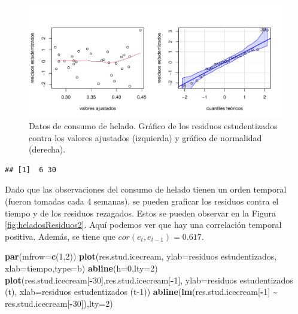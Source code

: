 \documentclass[
]{article}
\newenvironment{Shaded}{\begin{snugshade}}{\end{snugshade}}
\newcommand{\AttributeTok}[1]{\textcolor[rgb]{0.13,0.29,0.53}{#1}}
\newcommand{\DecValTok}[1]{\textcolor[rgb]{0.00,0.00,0.81}{#1}}
\newcommand{\FunctionTok}[1]{\textcolor[rgb]{0.13,0.29,0.53}{\textbf{#1}}}
\newcommand{\NormalTok}[1]{#1}
\newcommand{\SpecialCharTok}[1]{\textcolor[rgb]{0.81,0.36,0.00}{\textbf{#1}}}
\newcommand{\StringTok}[1]{\textcolor[rgb]{0.31,0.60,0.02}{#1}}
\begin{document}
\begin{figure}

{\centering \includegraphics{MLG1_files/figure-latex/heladosResiduos1-1} 

}

\caption{Datos de consumo de helado. Gráfico de los residuos estudentizados contra los valores ajustados (izquierda) y gráfico de normalidad (derecha).}\label{fig:heladosResiduos1}
\end{figure}

\begin{verbatim}
## [1]  6 30
\end{verbatim}

Dado que las observaciones del consumo de helado tienen un orden temporal (fueron tomadas cada 4 semanas), se pueden graficar los residuos contra el tiempo y de los residuos rezagados. Estos se pueden observar en la Figura \ref{fig:heladosResiduos2}. Aquí podemos ver que hay una correlación temporal positiva. Además, se tiene que \(cor(e_{t},e_{t-1}) = 0.617\).

\begin{Shaded}
\begin{Highlighting}[]
\FunctionTok{par}\NormalTok{(}\AttributeTok{mfrow=}\FunctionTok{c}\NormalTok{(}\DecValTok{1}\NormalTok{,}\DecValTok{2}\NormalTok{))}
\FunctionTok{plot}\NormalTok{(res.stud.icecream, }\AttributeTok{ylab=}\StringTok{\textquotesingle{}residuos estudentizados\textquotesingle{}}\NormalTok{,}
     \AttributeTok{xlab=}\StringTok{\textquotesingle{}tiempo\textquotesingle{}}\NormalTok{,}\AttributeTok{type=}\StringTok{\textquotesingle{}b\textquotesingle{}}\NormalTok{)}
\FunctionTok{abline}\NormalTok{(}\AttributeTok{h=}\DecValTok{0}\NormalTok{,}\AttributeTok{lty=}\DecValTok{2}\NormalTok{)}
\FunctionTok{plot}\NormalTok{(res.stud.icecream[}\SpecialCharTok{{-}}\DecValTok{30}\NormalTok{],res.stud.icecream[}\SpecialCharTok{{-}}\DecValTok{1}\NormalTok{], }\AttributeTok{ylab=}\StringTok{\textquotesingle{}residuos estudentizados (t)\textquotesingle{}}\NormalTok{,}
     \AttributeTok{xlab=}\StringTok{\textquotesingle{}residuos estudentizados (t{-}1)\textquotesingle{}}\NormalTok{)}
\FunctionTok{abline}\NormalTok{(}\FunctionTok{lm}\NormalTok{(res.stud.icecream[}\SpecialCharTok{{-}}\DecValTok{1}\NormalTok{] }\SpecialCharTok{\textasciitilde{}}\NormalTok{ res.stud.icecream[}\SpecialCharTok{{-}}\DecValTok{30}\NormalTok{]),}\AttributeTok{lty=}\DecValTok{2}\NormalTok{)}
\end{Highlighting}
\end{Shaded}
\end{document}
